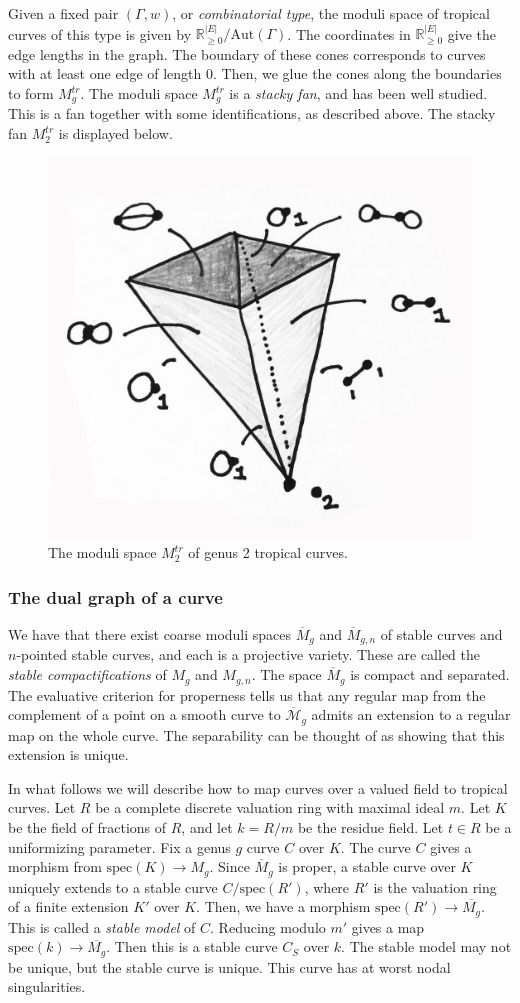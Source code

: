 Given a fixed pair $(\Gamma, w)$, or \emph{combinatorial type}, the moduli space of tropical curves of this type is given by $\mathbb{R}_{\geq 0}^{|E|} / \text{Aut}(\Gamma)$. The coordinates in $\mathbb{R}_{\geq 0}^{|E|}$ give the edge lengths in the graph. The boundary of these cones corresponds to curves with at least one edge of length 0. Then, we glue the cones along the boundaries to form $M_g^{tr}$. The moduli space  $M_g^{tr}$ is a \emph{stacky fan}, and has been well studied. This is a fan together with some identifications, as described above. The stacky fan $M_2^{tr}$ is displayed below.

 \begin{figure}[h]
\centering
  \includegraphics[width=.5\linewidth]{../Curves/ex-2-madeline-brandt/mgtrop2}
  \caption{The moduli space $M_2^{tr}$ of genus 2 tropical curves.}
  \label{mgtrop}
\end{figure}

\subsubsection{The dual graph of a curve}
We have that there exist coarse moduli spaces $\overline{M}_g$ and $\overline{M}_{g,n}$ of stable curves and $n$-pointed stable curves, and each is a projective variety. These are called the \emph{stable compactifications} of $M_g$ and $M_{g,n}$. The space $\overline{M}_g$ is compact and separated.
The evaluative criterion for properness tells us that any regular map from the complement of a point on a smooth curve to $\overline{\mathcal{M}}_g$ admits an extension to a regular map on the whole curve. The separability can be thought of as showing that this extension is unique. 

In what follows we will describe how to map curves over a valued field to tropical curves. Let $R$ be a complete discrete valuation ring with maximal ideal $m$. Let $K$ be the field of fractions of $R$, and let $k = R/m$ be the residue field. Let $t \in R$ be a uniformizing parameter. Fix a genus $g$ curve $C$ over $K$. The curve $C$ gives a morphism from $\text{spec}(K) \rightarrow M_{g}$. Since $\overline{M}_g$ is proper, a stable curve over $K$ uniquely extends to a stable curve $C / \text{spec}(R')$, where $R'$ is the valuation ring of a finite extension $K'$ over $K$. Then, we have a morphism $\text{spec}(R') \rightarrow \overline{M_{g}}$. This is called a \emph{stable model} of $C$. Reducing modulo $m'$ gives a map $\text{spec}(k) \rightarrow \overline{M_{g}}$. Then this is a stable curve $C_S$ over $k$. The stable model may not be unique, but the stable curve is unique. This curve has at worst nodal singularities.

